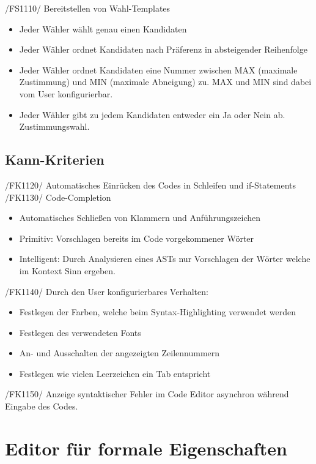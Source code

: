 \documentclass[a4paper]{scrreprt}
\begin{document}
/FS1110/ Bereitstellen von Wahl-Templates
\begin{itemize}
\item Jeder Wähler wählt genau einen Kandidaten
\item Jeder Wähler ordnet Kandidaten nach Präferenz in absteigender Reihenfolge 
\item Jeder Wähler ordnet Kandidaten eine Nummer zwischen MAX (maximale Zustimmung) und MIN (maximale Abneigung) zu. MAX und MIN sind dabei vom User konfigurierbar. 
\item Jeder Wähler gibt zu jedem Kandidaten entweder ein Ja oder Nein ab. Zustimmungswahl.
\end{itemize}

\subsection{Kann-Kriterien}
/FK1120/ Automatisches Einrücken des Codes in Schleifen und if-Statements \\
/FK1130/ Code-Completion
\begin{itemize}
\item Automatisches Schließen von Klammern und Anführungszeichen
\item Primitiv: Vorschlagen bereits im Code vorgekommener Wörter
\item Intelligent: Durch Analysieren eines ASTs nur Vorschlagen der Wörter welche im Kontext Sinn ergeben.
\end{itemize}

/FK1140/ Durch den User konfigurierbares Verhalten:
\begin{itemize}
\item Festlegen der Farben, welche beim Syntax-Highlighting verwendet werden
\item Festlegen des verwendeten Fonts
\item An- und Ausschalten der angezeigten Zeilennummern
\item Festlegen wie vielen Leerzeichen ein Tab entspricht
\end{itemize}
/FK1150/ Anzeige syntaktischer Fehler im Code Editor asynchron während Eingabe des Codes.
 
\section{Editor für formale Eigenschaften}
\end{document}
